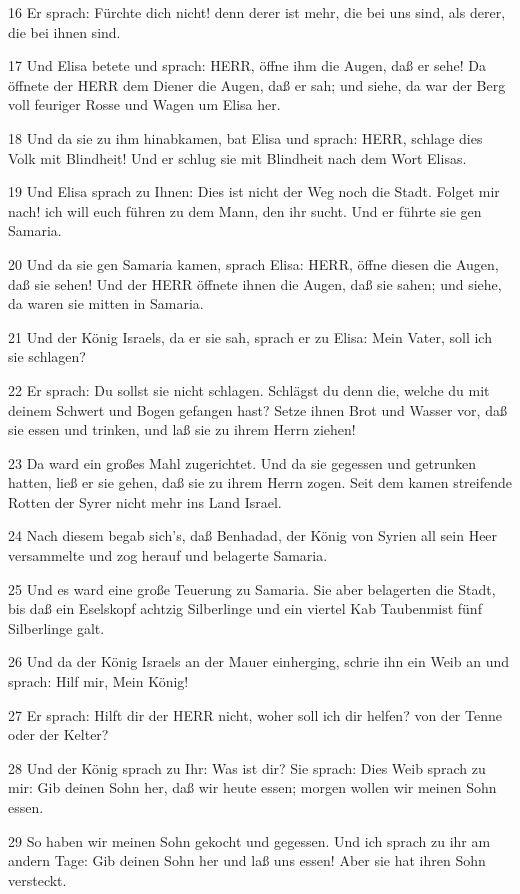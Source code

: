 \par 16 Er sprach: Fürchte dich nicht! denn derer ist mehr, die bei uns sind, als derer, die bei ihnen sind.
\par 17 Und Elisa betete und sprach: HERR, öffne ihm die Augen, daß er sehe! Da öffnete der HERR dem Diener die Augen, daß er sah; und siehe, da war der Berg voll feuriger Rosse und Wagen um Elisa her.
\par 18 Und da sie zu ihm hinabkamen, bat Elisa und sprach: HERR, schlage dies Volk mit Blindheit! Und er schlug sie mit Blindheit nach dem Wort Elisas.
\par 19 Und Elisa sprach zu Ihnen: Dies ist nicht der Weg noch die Stadt. Folget mir nach! ich will euch führen zu dem Mann, den ihr sucht. Und er führte sie gen Samaria.
\par 20 Und da sie gen Samaria kamen, sprach Elisa: HERR, öffne diesen die Augen, daß sie sehen! Und der HERR öffnete ihnen die Augen, daß sie sahen; und siehe, da waren sie mitten in Samaria.
\par 21 Und der König Israels, da er sie sah, sprach er zu Elisa: Mein Vater, soll ich sie schlagen?
\par 22 Er sprach: Du sollst sie nicht schlagen. Schlägst du denn die, welche du mit deinem Schwert und Bogen gefangen hast? Setze ihnen Brot und Wasser vor, daß sie essen und trinken, und laß sie zu ihrem Herrn ziehen!
\par 23 Da ward ein großes Mahl zugerichtet. Und da sie gegessen und getrunken hatten, ließ er sie gehen, daß sie zu ihrem Herrn zogen. Seit dem kamen streifende Rotten der Syrer nicht mehr ins Land Israel.
\par 24 Nach diesem begab sich's, daß Benhadad, der König von Syrien all sein Heer versammelte und zog herauf und belagerte Samaria.
\par 25 Und es ward eine große Teuerung zu Samaria. Sie aber belagerten die Stadt, bis daß ein Eselskopf achtzig Silberlinge und ein viertel Kab Taubenmist fünf Silberlinge galt.
\par 26 Und da der König Israels an der Mauer einherging, schrie ihn ein Weib an und sprach: Hilf mir, Mein König!
\par 27 Er sprach: Hilft dir der HERR nicht, woher soll ich dir helfen? von der Tenne oder der Kelter?
\par 28 Und der König sprach zu Ihr: Was ist dir? Sie sprach: Dies Weib sprach zu mir: Gib deinen Sohn her, daß wir heute essen; morgen wollen wir meinen Sohn essen.
\par 29 So haben wir meinen Sohn gekocht und gegessen. Und ich sprach zu ihr am andern Tage: Gib deinen Sohn her und laß uns essen! Aber sie hat ihren Sohn versteckt.
